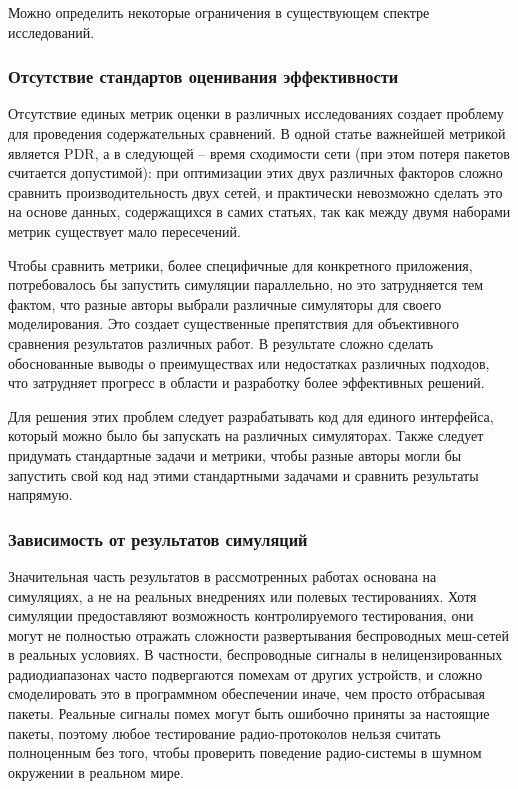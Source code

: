 \documentclass[%
]{report}
\begin{document}
Можно определить некоторые ограничения в существующем спектре
исследований.

\subsubsection{Отсутствие стандартов оценивания эффективности}\label{lack-of-uniform-evaluation-standards}

Отсутствие единых метрик оценки в различных исследованиях
создает проблему для проведения содержательных сравнений.
В одной статье важнейшей метрикой является PDR,
а в следующей -- время сходимости сети
(при этом потеря пакетов считается допустимой):
при оптимизации этих двух различных факторов
сложно сравнить производительность двух сетей,
и практически невозможно сделать это на основе данных,
содержащихся в самих статьях,
так как между двумя наборами метрик существует мало пересечений.

Чтобы сравнить метрики, более специфичные для
конкретного приложения, потребовалось бы запустить
симуляции параллельно, но это затрудняется тем фактом,
что разные авторы выбрали различные симуляторы для своего моделирования.
Это создает существенные препятствия для
объективного сравнения результатов различных работ.
В результате сложно сделать обоснованные выводы
о преимуществах или недостатках различных подходов,
что затрудняет прогресс в области и разработку
более эффективных решений.

Для решения этих проблем
следует разрабатывать код для единого интерфейса,
который можно было бы запускать на различных симуляторах.
Также следует придумать стандартные задачи
и метрики, чтобы
разные авторы могли бы запустить свой код
над этими стандартными задачами и сравнить результаты напрямую.

\subsubsection{Зависимость от результатов симуляций}\label{dependence-on-simulation-based-evidence}

Значительная часть результатов в
рассмотренных работах основана на симуляциях,
а не на реальных внедрениях или полевых тестированиях.
Хотя симуляции предоставляют возможность контролируемого
тестирования, они могут не полностью отражать
сложности развертывания беспроводных меш-сетей в
реальных условиях. В частности,
беспроводные сигналы в нелицензированных радиодиапазонах
часто подвергаются помехам от других устройств,
и сложно смоделировать это в программном обеспечении иначе,
чем просто отбрасывая пакеты.
Реальные сигналы помех могут быть ошибочно приняты
за настоящие пакеты,
поэтому любое тестирование радио-протоколов
нельзя считать полноценным без того, чтобы проверить
поведение радио-системы в шумном окружении в реальном мире.
\end{document}
